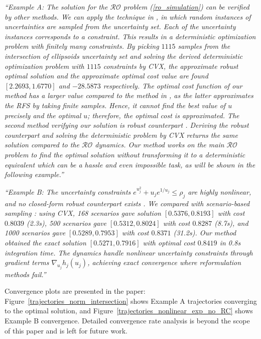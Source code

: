 \documentclass[journal,twoside,web]{ieeecolor}
\begin{document}
{\color{revisionblue}\textit{``Example A: The solution for the $\mathcal{RO}$ problem (\ref{ro_simulation}) can be verified by other methods. We can apply the technique in \cite{calafiore2004}, in which random instances of uncertainties are sampled from the uncertainty set. Each of the uncertainty instances corresponds to a constraint. This results in a deterministic optimization problem with finitely many constraints. By picking $1115$ samples from the intersection of ellipsoids uncertainty set and solving the derived deterministic optimization problem with $1115$ constraints by CVX, the approximate robust optimal solution and the approximate optimal cost value are found $[2.2693, 1.6770]$ and $-28.5873$ respectively. The optimal cost function of our method has a larger value compared to the method in \cite{calafiore2004}, as the latter approximates the RFS by taking finite samples. Hence, it cannot find the best value of $u$ precisely and the optimal $u$; therefore, the optimal cost is approximated. The second method verifying our solution is robust counterpart \cite{bental2009}. Deriving the robust counterpart and solving the deterministic problem by CVX returns the same solution compared to the $\mathcal{RO}$ dynamics. Our method works on the main $\mathcal{RO}$ problem to find the optimal solution without transforming it to a deterministic equivalent which can be a hassle and even impossible task, as will be shown in the following example.''}}

{\color{revisionblue}\textit{``Example B: The uncertainty constraints $e^{u_j^2}+u_j e^{1/u_j} \leq \rho_j$ are highly nonlinear, and no closed-form robust counterpart exists \cite{bental2009,gorissen20152}. We compared with scenario-based sampling \cite{calafiore2004}: using CVX, 168 scenarios gave solution $[0.5376, 0.8193]$ with cost $0.8039$ (2.3s), 500 scenarios gave $[0.5312, 0.8024]$ with cost $0.8287$ (8.7s), and 1000 scenarios gave $[0.5289, 0.7953]$ with cost $0.8371$ (31.2s). Our method obtained the exact solution $[0.5271, 0.7916]$ with optimal cost $0.8419$ in 0.8s integration time. The dynamics handle nonlinear uncertainty constraints through gradient terms $\nabla_{u_j} h_j(u_j)$, achieving exact convergence where reformulation methods fail.''}}

Convergence plots are presented in the paper: Figure~\ref{trajectories_norm_intersection} shows Example A trajectories converging to the optimal solution, and Figure~\ref{trajectories_nonlinear_exp_no_RC} shows Example B convergence. Detailed convergence rate analysis is beyond the scope of this paper and is left for future work.
\end{document}

